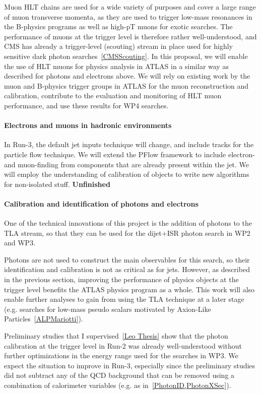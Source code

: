 Muon HLT chains are used for a wide variety of purposes and cover a large range of muon transverse momenta, as they are used to trigger low-mass resonances in the B-physics programs as well as high-pT muons for exotic searches. 
The performance of muons at the trigger level is therefore rather well-understood, and CMS has already a trigger-level (scouting) stream in place used for highly sensitive dark photon searches~\ref{CMSScouting}. In this proposal, we will enable the use of HLT muons for physics analysis in ATLAS in a similar way as described for photons and electrons above. We will rely on existing work  by the muon and B-physics trigger groups in ATLAS for the muon reconstruction and calibration, contribute to the evaluation and monitoring of HLT muon performance, and use these results for WP4 searches. 

\paragraph{Electrons and muons in hadronic environments}

In Run-3, the default jet inputs technique will change, and include tracks for the particle flow technique. 
We will extend the PFlow framework to include electron- and muon-finding from components that are already present within the jet. 
We will employ the understanding of calibration of objects to write new algorithms for non-isolated stuff. 
\textbf{Unfinished}
\paragraph{Calibration and identification of photons and electrons}
One of the technical innovations of this project is the addition of photons to the TLA stream, so that they can be used for the dijet+ISR photon search in WP2 and WP3.

Photons are not used to construct the main observables for this search, so their identification and calibration is not as critical as for jets. However, as described in the previous section, improving the performance of physics objects at the trigger level benefits the ATLAS physics program as a whole. This work will also enable further analyses to gain from using the TLA technique at a later stage (e.g. searches for low-mass pseudo scalars motivated by Axion-Like Particles~\ref{ALPMariotti}). 

Preliminary studies that I supervised~\ref{Leo Thesis} show that the photon calibration at the trigger level in Run-2 was already well-understood without further optimizations in the energy range used for the searches in WP3. We expect the situation to improve in Run-3, especially since the preliminary studies did not subtract any of the QCD background that can be removed using a combination of calorimeter variables (e.g. as in~\ref{PhotonID,PhotonXSec}). 

